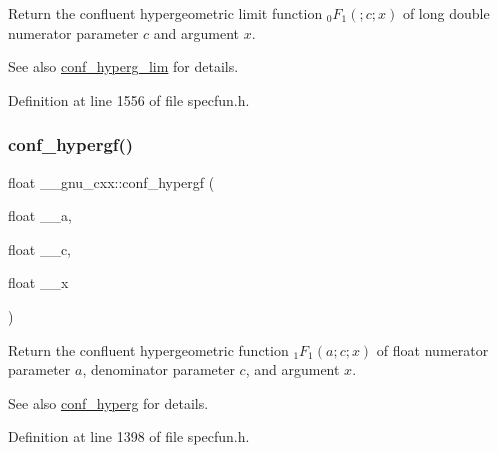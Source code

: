 Return the confluent hypergeometric limit function $ {}_0F_1(;c;x) $ of {\ttfamily long double} numerator parameter $ c $ and argument $ x $.

\begin{DoxySeeAlso}{See also}
\hyperlink{group__gnu__math__spec__func_ga9fe7a5e2e741f56d88fd29bc249feab2}{conf\+\_\+hyperg\+\_\+lim} for details. 
\end{DoxySeeAlso}


Definition at line 1556 of file specfun.\+h.

\mbox{\label{group__gnu__math__spec__func_gabd18e600aa78c3f2b2f835039506c810}} 
\subsubsection{\texorpdfstring{conf\+\_\+hypergf()}{conf\_hypergf()}}
{\footnotesize\ttfamily float \+\_\+\+\_\+gnu\+\_\+cxx\+::conf\+\_\+hypergf (\begin{DoxyParamCaption}\item[{float}]{\+\_\+\+\_\+a,  }\item[{float}]{\+\_\+\+\_\+c,  }\item[{float}]{\+\_\+\+\_\+x }\end{DoxyParamCaption})\hspace{0.3cm}{\ttfamily [inline]}}

Return the confluent hypergeometric function $ {}_1F_1(a;c;x) $ of {\ttfamily float} numerator parameter $ a $, denominator parameter $ c $, and argument $ x $.

\begin{DoxySeeAlso}{See also}
\hyperlink{group__gnu__math__spec__func_ga4d01e85e7d295afca5d9f8b6c68f19cc}{conf\+\_\+hyperg} for details. 
\end{DoxySeeAlso}


Definition at line 1398 of file specfun.\+h.

\mbox{\label{group__gnu__math__spec__func_ga0a9853f30d8fa515a12cd45a92da832e}} 
